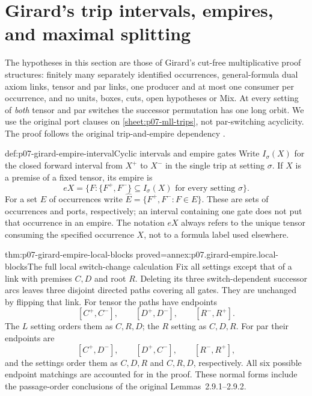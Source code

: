 \section{Girard's trip intervals, empires, and maximal splitting}
\label{sec:p07-girard-trips-empires}

The hypotheses in this section are those of Girard's cut-free
multiplicative proof structures: finitely many separately identified
occurrences, general-formula dual axiom links, tensor and par links,
one producer and at most one consumer per occurrence, and no units,
boxes, cuts, open hypotheses or Mix. At every setting of \emph{both}
tensor and par switches the successor permutation has one long orbit.
We use the original port clauses on \cref{sheet:p07-mll-trips}, not
par-switching acyclicity. The proof follows the original trip-and-empire
dependency \cite[pp.~35--40]{Girard1987AuthorHosted}.

\begin{hbdefinition}{def:p07-girard-empire-interval}{Cyclic intervals and empire gates}
Write \(I_\sigma(X)\) for the closed forward interval from \(X^+\)
to \(X^-\) in the single trip at setting \(\sigma\).
If \(X\) is a premise of a fixed tensor, its empire is
\[
 eX=\{F:\{F^+,F^-\}\subseteq I_\sigma(X)
                      \text{ for every setting }\sigma\}.
\]
For a set \(E\) of occurrences write
\(\widehat E=\{F^+,F^-:F\in E\}\).
These are sets of occurrences and ports, respectively; an interval
containing one gate does not put that occurrence in an empire.
The notation \(eX\) always refers to the unique tensor consuming the
specified occurrence \(X\), not to a formula label used elsewhere.
\end{hbdefinition}

\begin{hblemma}{thm:p07-girard-empire-local-blocks}
 {proved=annex:p07.girard-empire.local-blocks}{The full local switch-change calculation}
Fix all settings except that of a link with premises \(C,D\) and root \(R\).
Deleting its three switch-dependent successor arcs leaves three disjoint
directed paths covering all gates. They are unchanged by flipping that link.
For tensor the paths have endpoints
\[
 [C^+,C^-],\qquad[D^+,D^-],\qquad[R^-,R^+].
\]
The \(L\) setting orders them as \(C,R,D\); the \(R\) setting as \(C,D,R\).
For par their endpoints are
\[
 [C^+,D^-],\qquad[D^+,C^-],\qquad[R^-,R^+],
\]
and the settings order them as \(C,D,R\) and \(C,R,D\), respectively.
All six possible endpoint matchings are accounted for in the proof.
These normal forms include the passage-order conclusions of the
original Lemmas~2.9.1--2.9.2.
\end{hblemma}

